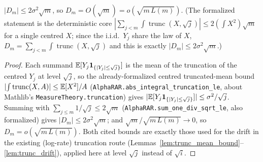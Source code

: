 \begin{lemma}\label{lem:hw_drift}
\leanok
{}
$|D_m|\le2\sigma^2\sqrt m$, so $D_m=O(\sqrt m)=o(\sqrt{m\,L(m)})$. (The formalized statement is the
deterministic core $|\sum_{j<m}\!\int\operatorname{trunc}(X,\sqrt j)|\le2(\int X^2)\sqrt m$ for a
single centred $X$; since the i.i.d.\ $Y_j$ share the law of $X$, $D_m=\sum_{j<m}\!\int
\operatorname{trunc}(X,\sqrt j)$ and this is exactly $|D_m|\le2\sigma^2\sqrt m$.)
\end{lemma}
\begin{proof}\leanok
Each summand $\mathbb{E}[Y_j\mathbf{1}_{\{|Y_j|\le\sqrt j\}}]$ is the mean of the truncation of the
centred $Y_j$ at level $\sqrt j$, so the already-formalized centred truncated-mean bound
$|\!\int\operatorname{trunc}(X,A)|\le\mathbb{E}[X^2]/A$
(\texttt{AlphaRAR.abs\_integral\_truncation\_le}, about Mathlib's
\texttt{MeasureTheory.truncation}) gives $|\mathbb{E}[Y_j\mathbf{1}_{\{|Y_j|\le\sqrt j\}}]|\le
\sigma^2/\sqrt j$. Summing with $\sum_{j\le m}1/\sqrt j\le2\sqrt m$
(\texttt{AlphaRAR.sum\_one\_div\_sqrt\_le}, also formalized) gives $|D_m|\le2\sigma^2
\sqrt m$; and $\sqrt m/\sqrt{m\,L(m)}\to0$, so $D_m=o(\sqrt{m\,L(m)})$. Both cited bounds
are exactly those used for the drift in the existing (log-rate) truncation route
(Lemmas~\ref{lem:trunc_mean_bound}--\ref{lem:trunc_drift}), applied here at level
$\sqrt j$ instead of $\sqrt i$.
\end{proof}

